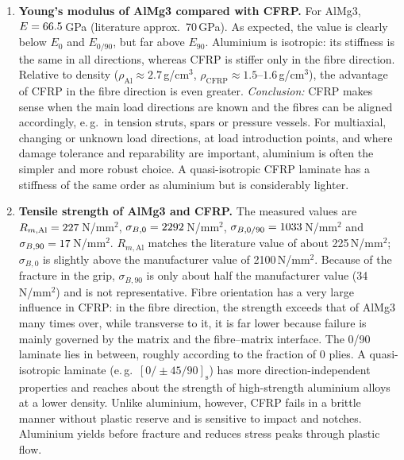 \documentclass[11pt,a4paper]{article}
\begin{document}
\begin{enumerate}[label=(\alph*)]
\item \textbf{Young's modulus of AlMg3 compared with CFRP.} For AlMg3,
$E = 66.5$\,GPa (literature approx.\ 70\,GPa). As expected, the value is
clearly below $E_{0}$ and $E_{0/90}$, but far above $E_{90}$. Aluminium is
isotropic: its stiffness is the same in all directions, whereas CFRP is
stiffer only in the fibre direction. Relative to density
($\rho_{\mathrm{Al}} \approx 2.7$\,g/cm$^3$,
$\rho_{\mathrm{CFRP}} \approx 1.5$--$1.6$\,g/cm$^3$), the advantage of CFRP in
the fibre direction is even greater. \emph{Conclusion:} CFRP makes sense when
the main load directions are known and the fibres can be aligned accordingly,
e.\,g.\ in tension struts, spars or pressure vessels. For multiaxial,
changing or unknown load directions, at load introduction points, and where
damage tolerance and reparability are important, aluminium is often the
simpler and more robust choice. A quasi-isotropic CFRP laminate has a
stiffness of the same order as aluminium but is considerably lighter.

\item \textbf{Tensile strength of AlMg3 and CFRP.} The measured values are
$R_{m,\mathrm{Al}} = 227$\,N/mm$^2$, $\sigma_{B,0} = 2292$\,N/mm$^2$,
$\sigma_{B,0/90} = 1033$\,N/mm$^2$ and
$\sigma_{B,90} = 17$\,N/mm$^2$. $R_{m,\mathrm{Al}}$ matches the
literature value of about 225\,N/mm$^2$; $\sigma_{B,0}$ is slightly above the
manufacturer value of 2100\,N/mm$^2$. Because of the fracture in the grip,
$\sigma_{B,90}$ is only about half the manufacturer value (34\,N/mm$^2$) and
is not representative. Fibre orientation has a very large influence in CFRP:
in the fibre direction, the strength exceeds that of AlMg3 many times over,
while transverse to it, it is far lower because failure is mainly governed by
the matrix and the fibre--matrix interface. The 0\textdegree/90\textdegree{}
laminate lies in between, roughly according to the fraction of 0\textdegree{}
plies. A quasi-isotropic laminate (e.\,g.\ $[0/\pm45/90]_\mathrm{s}$) has more
direction-independent properties and reaches about the strength of
high-strength aluminium alloys at a lower density. Unlike aluminium, however,
CFRP fails in a brittle manner without plastic reserve and is sensitive to
impact and notches. Aluminium yields before fracture and reduces stress peaks
through plastic flow.


\end{enumerate}
\end{document}
